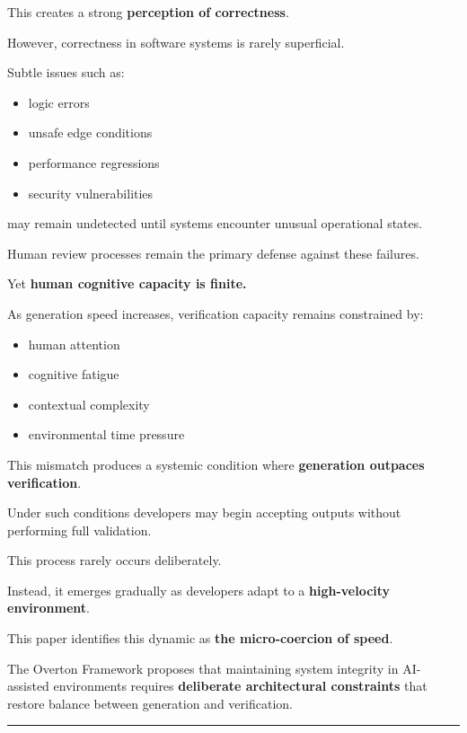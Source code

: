 \documentclass[
]{article}
\providecommand{\tightlist}{%
  \setlength{\itemsep}{0pt}\setlength{\parskip}{0pt}}
\begin{document}
This creates a strong \textbf{perception of correctness}.

However, correctness in software systems is rarely superficial.

Subtle issues such as:

\begin{itemize}
\tightlist
\item
  logic errors
\item
  unsafe edge conditions
\item
  performance regressions
\item
  security vulnerabilities
\end{itemize}

may remain undetected until systems encounter unusual operational
states.

Human review processes remain the primary defense against these
failures.

Yet \textbf{human cognitive capacity is finite.}

As generation speed increases, verification capacity remains constrained
by:

\begin{itemize}
\tightlist
\item
  human attention
\item
  cognitive fatigue
\item
  contextual complexity
\item
  environmental time pressure
\end{itemize}

This mismatch produces a systemic condition where \textbf{generation
outpaces verification}.

Under such conditions developers may begin accepting outputs without
performing full validation.

This process rarely occurs deliberately.

Instead, it emerges gradually as developers adapt to a
\textbf{high-velocity environment}.

This paper identifies this dynamic as \textbf{the micro-coercion of
speed}.

The Overton Framework proposes that maintaining system integrity in
AI-assisted environments requires \textbf{deliberate architectural
constraints} that restore balance between generation and verification.

\begin{center}\rule{0.5\linewidth}{0.5pt}\end{center}
\end{document}
